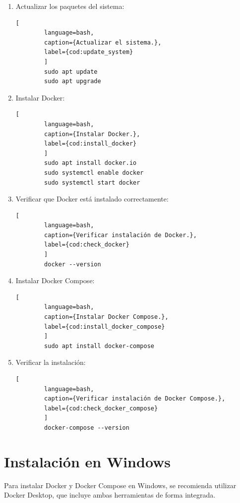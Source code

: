 \begin{enumerate}
	\item Actualizar los paquetes del sistema:
	\begin{lstlisting}[
		language=bash,
		caption={Actualizar el sistema.},
		label={cod:update_system}
		]
		sudo apt update
		sudo apt upgrade
	\end{lstlisting}
	
	\item Instalar Docker:
	\begin{lstlisting}[
		language=bash,
		caption={Instalar Docker.},
		label={cod:install_docker}
		]
		sudo apt install docker.io
		sudo systemctl enable docker
		sudo systemctl start docker
	\end{lstlisting}
	
	\item Verificar que Docker está instalado correctamente:
	\begin{lstlisting}[
		language=bash,
		caption={Verificar instalación de Docker.},
		label={cod:check_docker}
		]
		docker --version
	\end{lstlisting}
	
	\item Instalar Docker Compose:
	\begin{lstlisting}[
		language=bash,
		caption={Instalar Docker Compose.},
		label={cod:install_docker_compose}
		]
		sudo apt install docker-compose
	\end{lstlisting}
	
	\item Verificar la instalación:
	\begin{lstlisting}[
		language=bash,
		caption={Verificar instalación de Docker Compose.},
		label={cod:check_docker_compose}
		]
		docker-compose --version
	\end{lstlisting}
\end{enumerate}

\section{Instalación en Windows}

Para instalar Docker y Docker Compose en Windows, se recomienda utilizar Docker Desktop, que incluye ambas herramientas de forma integrada.

